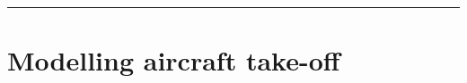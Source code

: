 \documentclass[a4paper]{article}
\begin{document}
\listoftodos

\bigskip
\noindent
\hrule

\bigskip

\section{Modelling aircraft take-off}

%
%
%
%
%
\end{document}

